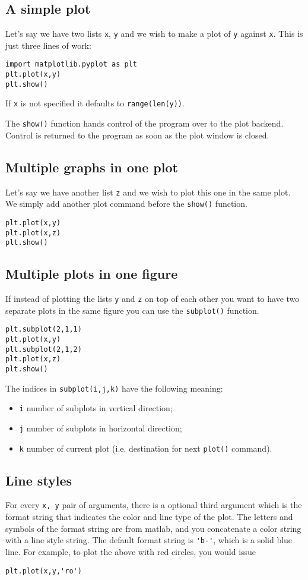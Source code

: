 \documentclass[10pt,a4paper]{article}
\begin{document}
\subsection{A simple plot}
Let's say we have two lists \verb|x|, \verb|y| and we wish to make a plot of \verb|y| against \verb|x|.
This is just three lines of work:
\begin{lstlisting}
import matplotlib.pyplot as plt
plt.plot(x,y)
plt.show()
\end{lstlisting}
If \verb|x| is not specified it defaults to \verb|range(len(y))|.

The \verb|show()| function hands control of the program over to the plot backend.
Control is returned to the program as soon as the plot window is closed.
\subsection{Multiple graphs in one plot}
Let's say we have another list \verb|z| and we wish to plot this one in the same plot.
We simply add another plot command before the \verb|show()| function.
\begin{lstlisting}
plt.plot(x,y)
plt.plot(x,z)
plt.show()
\end{lstlisting}
\subsection{Multiple plots in one figure}
If instead of plotting the lists \verb|y| and \verb|z| on top of each other you want to have two separate plots in the same figure you can use the \verb|subplot()| function.
\begin{lstlisting}
plt.subplot(2,1,1)
plt.plot(x,y)
plt.subplot(2,1,2)
plt.plot(x,z)
plt.show()
\end{lstlisting}
The indices in \verb|subplot(i,j,k)| have the following meaning:
\begin{itemize}
\item \verb|i| number of subplots in vertical direction;
\item \verb|j| number of subplots in horizontal direction;
\item \verb|k| number of current plot (i.e. destination for next \verb|plot()| command).
\end{itemize}
\subsection{Line styles}
For every \verb|x, y| pair of arguments, there is a optional third argument which is the format string that indicates the color and line type of the plot. The letters and symbols of the format string are from matlab, and you concatenate a color string with a line style string. The default format string is \verb|'b-'|, which is a solid blue line. For example, to plot the above with red circles, you would issue
\begin{lstlisting}
plt.plot(x,y,'ro')
\end{lstlisting}
\end{document}
